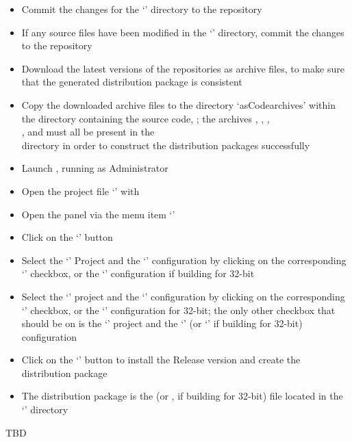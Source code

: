 \tertiaryEnd
{}
\begin{itemize}
\item Commit the changes for the `' directory to the
 repository
\item\exSp{}If any source files have been modified in the
`' directory, commit the changes to the
 repository
\item\exSp{}Download the latest versions of the  repositories as 
archive files, to make sure that the generated distribution package is consistent
\item\exSp{}Copy the downloaded  archive files to the directory
`asCode{archives}' within the directory containing the \mplusm{} source code,
; the archives ,
, ,\\
,  and
 must all be present in the\\
 directory in order to construct the
distribution packages successfully
\item\exSp{}Launch , running as Administrator
\item\exSp{}Open the project file
`' with
\item\exSp{}Open the  panel via the menu item
`'
\item\exSp{}Click on the `' button
\item\exSp{}Select the `' Project and the `'
configuration by clicking on the corresponding `' checkbox, or the
`' configuration if building for 32-bit
\item\exSp{}Select the `' project and the `'
configuration by clicking on the corresponding `' checkbox, or the
`' configuration for 32-bit; the only other checkbox that should be
on is the `' project and the `' (or
`' if building for 32-bit) configuration
\item\exSp{}Click on the `' button to install the Release version and create
the distribution package
\item\exSp{}The distribution package is the  (or
, if building for 32-bit) file located in the
`' directory
\end{itemize}
\tertiaryEnd
{}
TBD
\tertiaryEnd
\secondaryEnd
\appendixEnd{}
